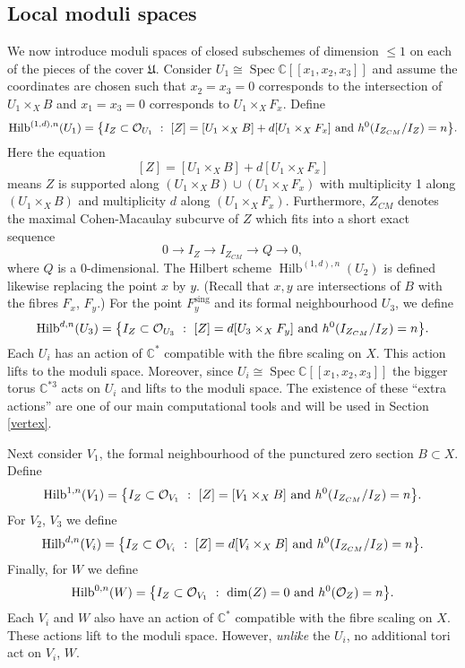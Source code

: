 \documentclass{amsart}
\theoremstyle{definition}
\newcommand{\CC} {\mathbb{C}}          %
\renewcommand{\O}{\mathcal{O}}
\newcommand{\Hilb}{\operatorname{Hilb}}
\newcommand{\Spec}{\operatorname{Spec}}
\newcommand{\sing}{\operatorname{sing}}
\begin{document}
\subsection{Local moduli spaces} \label{localmod}

We now introduce moduli spaces of closed subschemes of dimension $\leq 1$ on each of the pieces of the cover $\mathfrak{U}$. Consider $U_1 \cong \Spec \CC[\![ x_1,x_2,x_3]\!]$ and assume the coordinates are chosen such that $x_2=x_3=0$ corresponds to the intersection of $U_1 \times_X B$ and $x_1=x_3=0$ corresponds to $U_1 \times_X F_x$. Define
$$
\Hilb^{(1,d),n}(U_1) = \big\{ I_Z \subset \O_{U_1} \ : \ [Z] = [U_1 \times_X B] + d [U_1 \times_X F_x] \ {\rm{and}} \ h^0(I_{Z_{CM}} / I_Z) = n \big\}.
$$
Here the equation
$$
[Z] = [U_1 \times_X B] + d [U_1 \times_X F_x]
$$
means $Z$ is supported along $(U_1 \times_X B) \cup (U_1 \times_X F_x)$ with multiplicity 1 along $(U_1 \times_X B)$ and multiplicity $d$ along $(U_1 \times_X F_x)$. Furthermore, $Z_{CM}$ denotes the maximal Cohen-Macaulay subcurve of $Z$ which fits into a short exact sequence
$$
0 \longrightarrow I_{Z} \longrightarrow I_{Z_{CM}} \longrightarrow Q \longrightarrow 0, 
$$
where $Q$ is a 0-dimensional. The Hilbert scheme $\Hilb^{(1,d),n}(U_2)$ is defined likewise replacing the point $x$ by $y$. (Recall that $x,y$ are intersections of $B$ with the fibres $F_x$, $F_y$.) For the point $F_{y}^{\sing}$ and its formal neighbourhood $U_3$, we define
$$
\Hilb^{d,n}(U_3) = \big\{ I_Z \subset \O_{U_3} \ : \ [Z] = d [U_3 \times_X F_y] \ {\rm{and}} \ h^0(I_{Z_{CM}} / I_Z) = n \big\}.
$$
Each $U_i$ has an action of $\CC^*$ compatible with the fibre scaling on $X$. This action lifts to the moduli space. Moreover, since $U_i \cong \Spec \CC[\![x_1,x_2,x_3]\!]$ the bigger torus $\CC^{*3}$ acts on $U_i$ and lifts to the moduli space. The existence of these ``extra actions'' are one of our main computational tools and will be used in Section \ref{vertex}.

Next consider $V_1$, the formal neighbourhood of the punctured zero section $B \subset X$. Define
$$
\Hilb^{1,n}(V_1) = \big\{ I_Z \subset \O_{V_1} \ : \ [Z] = [V_1 \times_X B] \ {\rm{and}} \ h^0(I_{Z_{CM}} / I_Z) = n \big\}.
$$
For $V_2$, $V_3$ we define
$$
\Hilb^{d,n}(V_i) = \big\{ I_Z \subset \O_{V_i} \ : \ [Z] = d [V_i \times_X B] \ {\rm{and}} \ h^0(I_{Z_{CM}} / I_Z) = n \big\}.
$$
Finally, for $W$ we define
$$
\Hilb^{0,n}(W) = \big\{ I_Z \subset \O_{V_1} \ : \ \dim(Z) = 0 \ {\rm{and}} \ h^0(\O_Z) = n \big\}.
$$
Each $V_i$ and $W$ also have an action of $\CC^*$ compatible with the fibre scaling on $X$. These actions lift to the moduli space. However, \emph{unlike} the $U_i$, no additional tori act on $V_i$, $W$.
\end{document}
